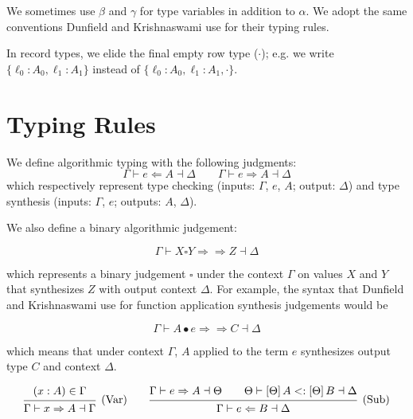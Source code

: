 \documentclass{article}
\newcommand{\subtype}{<:}
\newcommand{\synthesizes}{\Rightarrow \!\!\! \Rightarrow}
\newcommand{\app}{\bullet}
\newcommand{\spc}{\qquad}
\newcommand{\apply}[1]{\left[#1\right]}
\newcommand{\synth}[4]{#1 \vdash #2 \Rightarrow #3 \dashv #4}
\renewcommand{\check}[4]{#1 \vdash #2 \Leftarrow #3 \dashv #4}
\newcommand{\presynth}[6]{#1 \vdash #2 #3 #4 \synthesizes #5 \dashv #6}
\newcommand{\subtypes}[4]{#1 \vdash #2 \subtype #3 \dashv #4}
\newcommand{\deduct}[3][]
{
  \begin{prooftree}
    \hypo{#2}
    \infer1[\text{#1}]{#3}
  \end{prooftree}
}
\begin{document}
We sometimes use $\beta$ and $\gamma$ for type variables in addition
to $\alpha$. We adopt the same
conventions Dunfield and Krishnaswami use for their typing rules.

In record types, we elide the final empty row type
($\cdot$); e.g. we write $\{\ell_0 : A_0, \ell_1 : A_1\}$ instead of $\{\ell_0 : A_0, \ell_1 : A_1, \cdot\}$.


\section{Typing Rules}
We define algorithmic typing with the following judgments:
\[
\check{\Gamma}{e}{A}{\Delta}
\spc
\synth{\Gamma}{e}{A}{\Delta}
\]
which respectively represent type checking (inputs: $\Gamma$, $e$, $A$; output: $\Delta$) and type synthesis (inputs: $\Gamma$, $e$; outputs: $A$, $\Delta$).

We also define a binary algorithmic judgement:

\[
\presynth{\Gamma}{X}{\square}{Y}{Z}{\Delta}
\]

which represents a binary judgement \(\square\) under the context \(\Gamma\) on
values \(X\) and \(Y\) that synthesizes \(Z\) with output context \(\Delta\).
For example, the syntax that Dunfield and Krishnaswami use for function
application synthesis judgements would be

\[
\presynth \Gamma A \app e C \Delta
\]

which means that under context \(\Gamma\), \(A\) applied to the term \(e\)
synthesizes output type \(C\) and context \(\Delta\).

\[
  \deduct[(Var)]
  {
    (x : A) \in \Gamma
  }
  { \synth{\Gamma}{x}{A}{\Gamma} }
  \spc
  \deduct[(Sub)]
  {
    \synth{\Gamma}{e}{A}{\Theta} \spc
    \subtypes{\Theta}{\apply\Theta A}{\apply\Theta B}{\Delta}
  }
  { \check{\Gamma}{e}{B}{\Delta} }
\]
\end{document}
